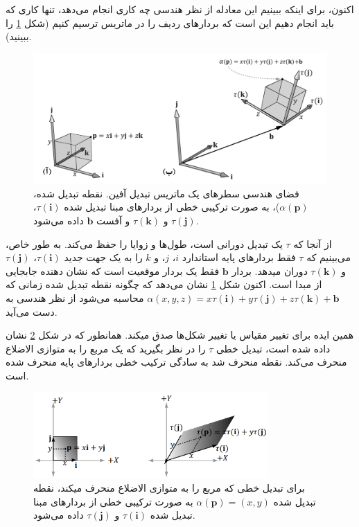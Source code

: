 {\begin{spacing}{1.5}
        اکنون، برای اینکه ببینیم این معادله از نظر هندسی چه کاری انجام می‌دهد، تنها کاری که باید انجام دهیم این است که بردارهای ردیف را در ماتریس ترسیم کنیم (شکل \ref{fig:4.Session.1.3.7} را ببینید).
        \begin{figure}[H]
            \centering
            \setlength{\belowcaptionskip}{-10pt}
            \includegraphics[width=\textwidth]{Images/4/3/4.Session.1.3.7}
            \caption {فضای هندسی سطرهای یک ماتریس تبدیل آفین. نقطه تبدیل شده، $\alpha(\textbf{p})$)، به صورت ترکیبی خطی از بردارهای مبنا تبدیل شده $\tau(\textbf{i})$، $\tau(\textbf{j})$ و $\tau(\textbf{k})$ و آفست $\textbf{b}$ داده می‌شود.}
            \label{fig:4.Session.1.3.7}
        \end{figure}
        از آنجا که $\tau$ یک تبدیل دورانی است، طول‌ها و زوایا را حفظ می‌کند.
        به طور خاص، می‌بینیم که $\tau$ فقط بردارهای پایه استاندارد $i$، $j$، و $k$ را به یک جهت جدید $\tau(\textbf{i})$، $\tau(\textbf{j})$ و $\tau(\textbf{k})$ دوران میدهد.
        بردار $\textbf{b}$ فقط یک بردار موقعیت است که نشان دهنده جابجایی از مبدا است.
        اکنون شکل \ref{fig:4.Session.1.3.7} نشان می‌دهد که چگونه نقطه تبدیل شده زمانی که $\alpha(x,y,z)=x\tau(\textbf{i})+y\tau(\textbf{j})+z\tau(\textbf{k})+\textbf{b}$ محاسبه می‌شود از نظر هندسی به دست می‌آید.

        همین ایده برای تغییر مقیاس یا تغییر شکل‌ها صدق میکند. همانطور که در شکل \ref{fig:4.Session.1.3.8} نشان داده شده است،
        تبدیل خطی $\tau$ را در نظر بگیرید که یک مربع را به متوازی الاضلاع منحرف می‌کند.
        نقطه منحرف شد به سادگی ترکیب خطی بردارهای پایه منحرف شده است.
        \begin{figure}[H]
            \centering
            \setlength{\belowcaptionskip}{-10pt}
            \includegraphics[width=0.8\textwidth]{Images/4/3/4.Session.1.3.8}
            \caption {برای تبدیل خطی که مربع را به متوازی الاضلاع منحرف میکند، نقطه تبدیل شده $\alpha(\textbf{p})=(x,y)$ به صورت ترکیبی خطی از بردارهای مبنا تبدیل شده $\tau(\textbf{i})$ و $\tau(\textbf{j})$ داده می‌شود.}
            \label{fig:4.Session.1.3.8}
        \end{figure}
    \end{spacing}
}


